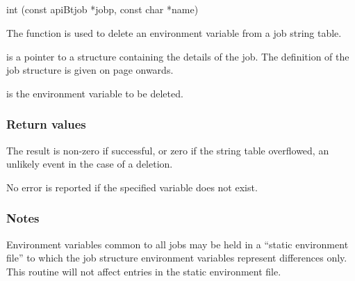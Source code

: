 \subsection{\funcnameXBdelenv{}}

\begin{expara}

int \funcnameXBdelenv{}(const apiBtjob *jobp, const char *name)

\end{expara}

The function \funcXBgetenv{} is used to delete an environment variable from a job string table.

 is a pointer to a structure containing the details of the job. The definition of the job structure is given on
page \pageref{bkm:Jobstructure} onwards.

 is the environment variable to be deleted.

\subsubsection{Return values}
The result is non-zero if successful, or zero if the string table overflowed, an unlikely event in the case of a deletion.

No error is reported if the specified variable does not exist.

\subsubsection{Notes}
Environment variables common to all jobs may be held in a ``static environment file'' to which the job
structure environment variables represent differences only. This routine will not affect entries in the static environment file.

